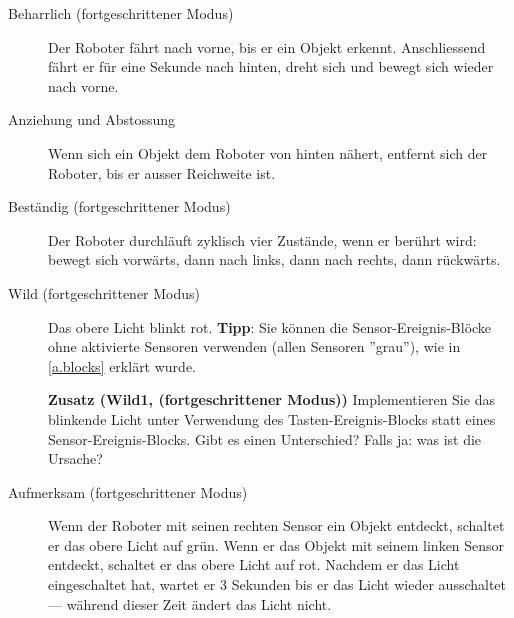 \begin{description}
\item[Beharrlich (fortgeschrittener Modus)] Der Roboter fährt nach vorne, bis er ein Objekt erkennt. Anschliessend fährt er für eine Sekunde nach hinten, dreht sich und bewegt sich wieder nach vorne.

\item[Anziehung und Abstossung] Wenn sich ein Objekt dem Roboter von hinten nähert, entfernt sich der Roboter, bis er ausser Reichweite ist.

\item[Beständig (fortgeschrittener Modus)] Der Roboter durchläuft zyklisch vier Zustände, wenn er berührt wird: bewegt sich vorwärts, dann nach links, dann nach rechts, dann rückwärts.

\item[Wild (fortgeschrittener Modus)] Das obere Licht blinkt rot. \textbf{Tipp}:
Sie können die Sensor-Ereignis-Blöcke ohne aktivierte Sensoren verwenden (allen Sensoren ''grau''), wie in \cref{a.blocks} erklärt wurde. 

\textbf{Zusatz (Wild1, (fortgeschrittener Modus))} Implementieren Sie das blinkende Licht unter Verwendung des Tasten-Ereignis-Blocks statt eines Sensor-Ereignis-Blocks. Gibt es einen Unterschied? Falls ja: was ist die Ursache?

\newpage
\item[Aufmerksam (fortgeschrittener Modus)] Wenn der Roboter mit seinen rechten Sensor ein Objekt entdeckt, schaltet er das obere Licht auf grün. Wenn er das Objekt mit seinem linken Sensor entdeckt, schaltet er das obere Licht auf rot. Nachdem er das Licht eingeschaltet hat, wartet er 3 Sekunden bis er das Licht wieder ausschaltet --- während dieser Zeit ändert das Licht nicht. 

\end{description}
